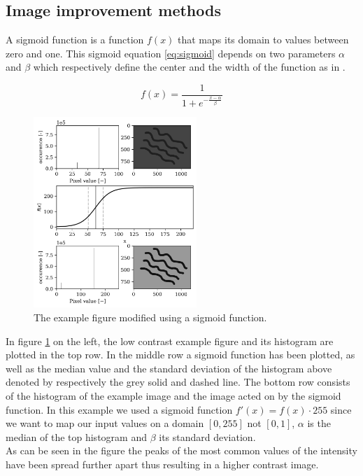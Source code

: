 \subsection{Image improvement methods}

A sigmoid function is a function $f(x)$ that maps its domain to values between zero and one. This sigmoid equation \ref{eq:sigmoid} depends on two parameters $\alpha$ and $\beta$ which respectively define the center and the width of the function as in \cite{article_sigmoid}.

\begin{equation}
    f(x) = \frac{1}{1+e^{-\frac{x-\alpha}{\beta}}}
    \label{eq:sigmoid}
\end{equation}
\newpage
\begin{figure}
    \centering
    \includegraphics[width=0.55\textwidth,keepaspectratio]{afbeeldingen/sigmoid_explained.png}
    \caption{The example figure modified using a sigmoid function.}
    \label{fig:sigmoid}
\end{figure}

In figure \ref{fig:sigmoid} on the left, the low contrast example figure and its histogram are plotted in the top row. In the middle row a sigmoid function has been plotted, as well as the median value and the standard deviation of the histogram above denoted by respectively the grey solid and dashed line. The bottom row consists of the histogram of the example image and the image acted on by the sigmoid function. In this example we used a sigmoid function $f'(x)=f(x) \cdot 255$ since we want to map our input values on a domain $[0,255]$ not $[0,1]$, $\alpha$ is the median of the top histogram and $\beta$ its standard deviation.\\
As can be seen in the figure the peaks of the most common values of the intensity have been spread further apart thus resulting in a higher contrast image.\\


